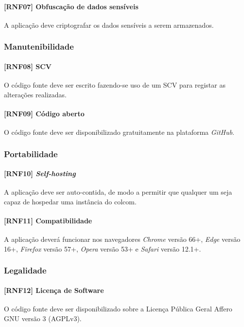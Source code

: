 \paragraph{[RNF07] Obfuscação de dados sensíveis}
A aplicação deve criptografar os dados sensíveis a serem armazenados.


\subsubsection{Manutenibilidade}

\paragraph{[RNF08] SCV}
O código fonte deve ser escrito fazendo-se uso de um SCV para registar as alterações realizadas.

\paragraph{[RNF09] Código aberto}
O código fonte deve ser disponibilizado gratuitamente na plataforma \textit{GitHub}.


\subsubsection{Portabilidade}

\paragraph{[RNF10] \textit{Self-hosting}}
A aplicação deve ser auto-contida, de modo a permitir que qualquer um seja capaz de hospedar uma instância do colcom.

\paragraph{[RNF11] Compatibilidade}
A aplicação deverá funcionar nos navegadores \textit{Chrome} versão 66+, \textit{Edge} versão 16+, \textit{Firefox} versão 57+, \textit{Opera} versão 53+ e \textit{Safari} versão 12.1+.


\subsubsection{Legalidade}

\paragraph{[RNF12] Licença de Software}
O código fonte deve ser disponibilizado sobre a Licença Pública Geral Affero GNU versão 3 (AGPLv3).

